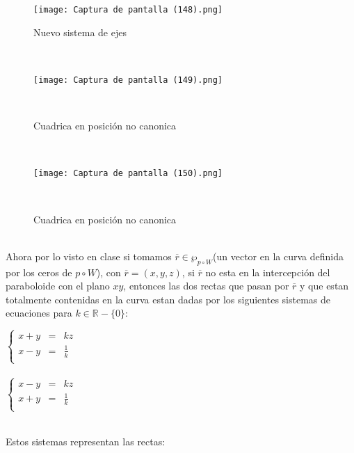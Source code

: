 \documentclass[11pt,letterpaper]{article}
\newcommand{\R}{\mathbb{R}}
\begin{document}
    \begin{figure}
    \centering
    \texttt{[image: Captura de pantalla (148).png]}
    \caption{Nuevo sistema de ejes}
    \label{Cono rebanado}
     \end{figure}\,\\
     \begin{figure}
    \begin{center}
    \texttt{[image: Captura de pantalla (149).png]}
    \caption{Cuadrica en posici\'on no canonica}
    \label{Cono rebanado}\,\\
     \end{center}
    \end{figure}\,\\
    \begin{figure}
    \begin{center}
    \texttt{[image: Captura de pantalla (150).png]}
    \caption{Cuadrica en posici\'on no canonica}
    \label{Cono rebanado}\,\\
     \end{center}
    \end{figure}
    \newpage
    \,\\
     Ahora por lo visto en clase si tomamos $\overline{r}\in \wp_{p\circ W}$(un vector en la curva definida por los ceros de $p\circ W$), con $\overline{r}=(x,y,z)$, si 
    $\overline{r}$ no esta en la intercepci\'on del paraboloide con el plano $xy$, entonces las dos rectas que pasan por
    $\overline{r}$ y que estan totalmente contenidas en la curva estan dadas por los siguientes sistemas de ecuaciones para $k\in \R-\{0\}$:\,\\
    \begin{center}
     $\left\{ 
         \begin{array}{rcl}
            x+y&=&kz\\
            x-y&=&\frac{1}{k}\\
         \end{array}
       \right.$\,\\
       \,\\
       $\left\{ 
         \begin{array}{rcl}
            x-y&=&kz\\
            x+y&=&\frac{1}{k}\\
         \end{array}
       \right.$\,\\
        \end{center}\,\\
        Estos sistemas representan las rectas:\,\\
\end{document}
